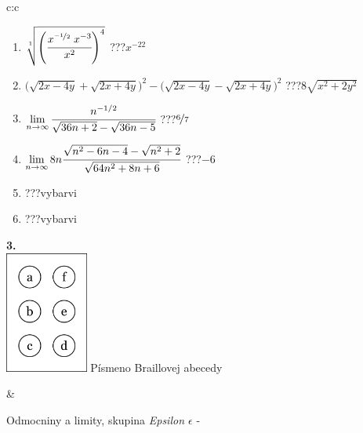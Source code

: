 \documentclass[10pt]{report}
\begin{document}
\begin{tabular}{c:c}
\begin{minipage}[c][104.5mm][t]{0.5\linewidth}
\begin{center}
\begin{minipage}{0.79\linewidth}
\begin{center}
\begin{varwidth}{\linewidth}
\begin{enumerate}
\small
\item $\sqrt[1]{\left(\cfrac{x^{\nicefrac{-1}{2}}\;x^{-3}}{x^{2}}\right)^{4}}$\quad \dotfill\; ???\;\dotfill \quad $x^{-22}$
\item {\footnotesize{\scriptsize$\big(\sqrt{2x-4y}+\sqrt{2x+4y}\big)^2-\big(\sqrt{2x-4y}-\sqrt{2x+4y}\big)^2$}\quad \dotfill\; ???\;\dotfill \quad $8\sqrt{x^2+2y^2}$}
\item $\lim\limits_{n\to\infty}\cfrac{n^{-1/2}}{\sqrt{36n+2}-\sqrt{36n-5}}$\quad \dotfill\; ???\;\dotfill \quad $\nicefrac{6}{7}$
\item $\lim\limits_{n\to\infty}8n\cfrac{\sqrt{n^2-6n-4}-\sqrt{n^2+2}}{\sqrt{64n^2+8n+6}}$\quad \dotfill\; ???\;\dotfill \quad $-6$
\item \quad \dotfill\; ???\;\dotfill \quad vybarvi
\item \quad \dotfill\; ???\;\dotfill \quad vybarvi
\end{enumerate}
\end{varwidth}
\end{center}
\end{minipage}
\begin{minipage}{0.20\linewidth}
\begin{center}
{\Huge\bfseries 3.} \\[2mm]
\includegraphics[height=40mm]{../images/braille.png}
{\small Písmeno Braillovej abecedy}
\end{center}
\end{minipage}
\end{center}
\end{minipage}
&
\begin{minipage}[c][104.5mm][t]{0.5\linewidth}
\begin{center}
\vspace{7mm}
{\huge Odmocniny a limity, skupina \textit{Epsilon $\epsilon$} -}\\[5mm]

\end{center}
\end{minipage}
\end{tabular}
\end{document}
